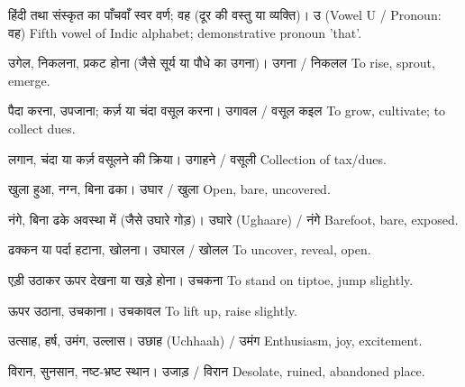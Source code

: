 
%
{हिंदी तथा संस्कृत का पाँचवाँ स्वर वर्ण; वह (दूर की वस्तु या व्यक्ति)।}%
{उ (Vowel U / Pronoun: वह)}%
{Fifth vowel of Indic alphabet; demonstrative pronoun 'that'.}

%
{उगेल, निकलना, प्रकट होना (जैसे सूर्य या पौधे का उगना)।}%
{उगना / निकलल}%
{To rise, sprout, emerge.}

%
{पैदा करना, उपजाना; कर्ज़ या चंदा वसूल करना।}%
{उगावल / वसूल कइल}%
{To grow, cultivate; to collect dues.}

%
{लगान, चंदा या कर्ज़ वसूलने की क्रिया।}%
{उगाहने / वसूली}%
{Collection of tax/dues.}

%
{खुला हुआ, नग्न, बिना ढका।}%
{उघार / खुला}%
{Open, bare, uncovered.}

%
{नंगे, बिना ढके अवस्था में (जैसे उघारे गोड़)।}%
{उघारे (Ughaare) / नंगे}%
{Barefoot, bare, exposed.}

%
{ढक्कन या पर्दा हटाना, खोलना।}%
{उघारल / खोलल}%
{To uncover, reveal, open.}

%
{एड़ी उठाकर ऊपर देखना या खड़े होना।}%
{उचकना}%
{To stand on tiptoe, jump slightly.}

%
{ऊपर उठाना, उचकाना।}%
{उचकावल}%
{To lift up, raise slightly.}

%
{उत्साह, हर्ष, उमंग, उल्लास।}%
{उछाह (Uchhaah) / उमंग}%
{Enthusiasm, joy, excitement.}

%
{विरान, सुनसान, नष्ट-भ्रष्ट स्थान।}%
{उजाड़ / विरान}%
{Desolate, ruined, abandoned place.}

